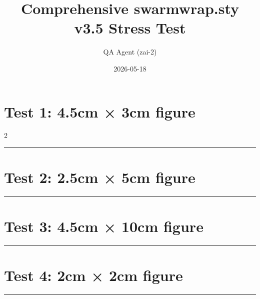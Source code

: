 \documentclass[a4paper,11pt]{article}
\title{Comprehensive swarmwrap.sty v3.5 Stress Test}
\author{QA Agent (zai-2)}
\date{2026-05-18}
\begin{document}
\maketitle



\section*{Test 1: 4.5cm × 3cm figure}
\begin{multicols}{2}
  \begin{swarmwrap}%
    \begin{minipage}[t]{4cm}
      \centering
      \rule{\linewidth}{3cm}
    \end{minipage}%
  \end{swarmwrap}%
  \swarmwrapnext
  \lipsum[72]
  \lipsum[73]
  \lipsum[74]
\end{multicols}
\section*{Test 2: 2.5cm × 5cm figure}
\begin{swarmwrap}%
  \begin{minipage}[t]{2cm}
    \centering
    \rule{\linewidth}{5cm}
  \end{minipage}%
\end{swarmwrap}%
\swarmwrapnext
\lipsum[28]
\lipsum[29]
\lipsum[30]
\lipsum[31]
\section*{Test 3: 4.5cm × 10cm figure}
\begin{swarmwrap}%
  \begin{minipage}[t]{4cm}
    \centering
    \rule{\linewidth}{10cm}
  \end{minipage}%
\end{swarmwrap}%
\swarmwrapnext
\lipsum[110]
\lipsum[111]
\lipsum[112]
\section*{Test 4: 2cm × 2cm figure}
\begin{swarmwrap}%
  \begin{minipage}[t]{2cm}
    \centering
    \rule{\linewidth}{2cm}
  \end{minipage}%
\end{swarmwrap}%
\swarmwrapnext
\lipsum[57]
\lipsum[58]
\lipsum[59]
\end{document}
